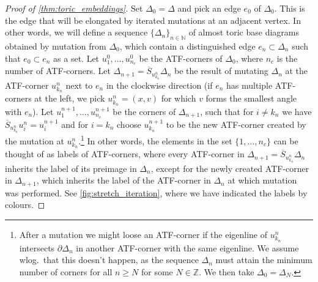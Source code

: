 \documentclass[12pt,a4paper,draft]{scrartcl}
\begin{document}
\begin{proof}[Proof of \cref{thm:toric_embeddings}]
  Set $Δ_0 = Δ$ and pick an edge $e_0$ of $Δ_0$. This is the edge that will be elongated by iterated mutations at an adjacent vertex. In other words, we will define a sequence $\{\Delta_n\}_{n \in  \mathbb{N}}$ of almost toric base diagrams obtained by mutation from $\Delta_0$, which contain a distinguished edge $e_n \subset \Delta_n$ such that $e_0 \subset e_n$ as a set.
  Let $u_1^0,…,u_{n_c}^0$ be the ATF-corners of $Δ_0$, where $n_c$ is the number of ATF-corners. Let $Δ_{n+1} = \overline{S}_{u_{k_n}^n} Δ_n$ be the result of mutating $Δ_n$ at the ATF-corner $u_{k_n}^n$ next to $e_n$ in the clockwise direction (if $e_n$ has multiple ATF-corners at the left, we pick $u_{k_n}^n = (x,v)$ for which $v$ forms the smallest angle with $e_n$).
  Let $u_1^{n+1},…,u_{n_c}^{n+1}$ be the corners of $Δ_{n+1}$, such that for $i ≠ k_n$ we have $\overline{S}_{u_{k_n}^n} u_i^n = u_i^{n+1}$ and for $i=k_n$ choose $u_{k_n}^{n+1}$ to be the new ATF-corner created by the mutation at $u_{k_n}^n$.\footnote{After a mutation we might loose an ATF-corner if the eigenline of $u_{k_n}^n$ intersects $∂Δ_n$ in another ATF-corner with the same eigenline.
We assume wlog.\ that this doesn't happen, as the sequence $Δ_n$ must attain the minimum number of corners for all $n ≥N$ for some $N ∈ ℤ$.
We then take $Δ_0=Δ_N$.} In other words, the elements in the set $\{1,\ldots,n_c\}$ can be thought of as labels of ATF-corners, where every ATF-corner in $Δ_{n+1} = \overline{S}_{u_{k_n}^n} Δ_n$ inherits the label of its preimage in $\Delta_n$, except for the newly created ATF-corner in $\Delta_{n+1}$, which inherits the label of the ATF-corner in $\Delta_n$ at which mutation was performed. 
See \cref{fig:stretch_iteration}, where we have indicated the labels by colours.


\end{proof}
\end{document}
